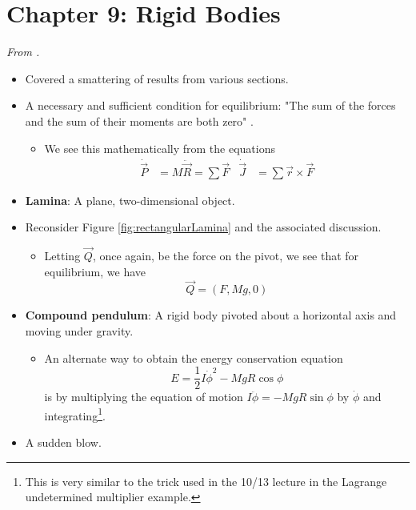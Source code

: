 \documentclass[../notes.tex]{subfiles}
\begin{document}
\section{Chapter 9: Rigid Bodies}
\emph{From \textcite{bib:KibbleBerkshire}.}
\begin{itemize}
    \item Covered a smattering of results from various sections.
    \item {}A necessary and sufficient condition for equilibrium: "The sum of the forces and the sum of their moments are both zero" \parencite[198]{bib:KibbleBerkshire}.
    \begin{itemize}
        \item We see this mathematically from the equations
        \begin{align*}
            \dot{\vec{P}} &= M\ddot{\vec{R}} = \sum\vec{F}&
            \dot{\vec{J}} &= \sum\vec{r}\times\vec{F}
        \end{align*}
    \end{itemize}
    \item \textbf{Lamina}: A plane, two-dimensional object.
    \item Reconsider Figure \ref{fig:rectangularLamina} and the associated discussion.
    \begin{itemize}
        \item Letting $\vec{Q}$, once again, be the force on the pivot, we see that for equilibrium, we have
        \begin{equation*}
            \vec{Q} = (F,Mg,0)
        \end{equation*}
    \end{itemize}
    \item \textbf{Compound pendulum}: A rigid body pivoted about a horizontal axis and moving under gravity.
    \begin{itemize}
        \item An alternate way to obtain the energy conservation equation
        \begin{equation*}
            E = \frac{1}{2}I\dot{\phi}^2-MgR\cos\phi
        \end{equation*}
        is by multiplying the equation of motion $I\ddot{\phi}=-MgR\sin\phi$ by $\dot{\phi}$ and integrating\footnote{This is very similar to the trick used in the 10/13 lecture in the Lagrange undetermined multiplier example.}.
    \end{itemize}
    \item A sudden blow.
    \begin{itemize}

\end{itemize}
\end{itemize}
\end{document}
